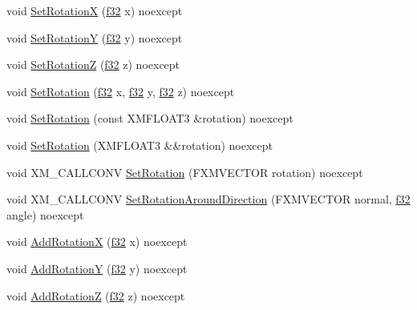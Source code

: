 \begin{DoxyCompactItemize}
\item 
void \hyperlink{structmage_1_1_transform_node_a5176ee15f528c0c9a7d7fb716a69362a}{Set\+RotationX} (\hyperlink{namespacemage_a6a44ad388483959dc4dff9f2aef91431}{f32} x) noexcept
\item 
void \hyperlink{structmage_1_1_transform_node_ae117a889122ecdb4f7e16a78f240c7c6}{Set\+RotationY} (\hyperlink{namespacemage_a6a44ad388483959dc4dff9f2aef91431}{f32} y) noexcept
\item 
void \hyperlink{structmage_1_1_transform_node_a2fe3254e45a9ab3a7513f2162bd17c7f}{Set\+RotationZ} (\hyperlink{namespacemage_a6a44ad388483959dc4dff9f2aef91431}{f32} z) noexcept
\item 
void \hyperlink{structmage_1_1_transform_node_ad11cdc2280a68d309f2e725edbe85ba6}{Set\+Rotation} (\hyperlink{namespacemage_a6a44ad388483959dc4dff9f2aef91431}{f32} x, \hyperlink{namespacemage_a6a44ad388483959dc4dff9f2aef91431}{f32} y, \hyperlink{namespacemage_a6a44ad388483959dc4dff9f2aef91431}{f32} z) noexcept
\item 
void \hyperlink{structmage_1_1_transform_node_a602e7426e81f712a2c5dfcb29e69457b}{Set\+Rotation} (const X\+M\+F\+L\+O\+A\+T3 \&rotation) noexcept
\item 
void \hyperlink{structmage_1_1_transform_node_aceda2ef578b04428dd7a271943daa8c8}{Set\+Rotation} (X\+M\+F\+L\+O\+A\+T3 \&\&rotation) noexcept
\item 
void X\+M\+\_\+\+C\+A\+L\+L\+C\+O\+NV \hyperlink{structmage_1_1_transform_node_a354d20ffedec33173a598718677f7a74}{Set\+Rotation} (F\+X\+M\+V\+E\+C\+T\+OR rotation) noexcept
\item 
void X\+M\+\_\+\+C\+A\+L\+L\+C\+O\+NV \hyperlink{structmage_1_1_transform_node_a2507c9b2ba9c22f840a6d4f7fbf6e26b}{Set\+Rotation\+Around\+Direction} (F\+X\+M\+V\+E\+C\+T\+OR normal, \hyperlink{namespacemage_a6a44ad388483959dc4dff9f2aef91431}{f32} angle) noexcept
\item 
void \hyperlink{structmage_1_1_transform_node_a345433c783c276d3a68951ef9f57c90e}{Add\+RotationX} (\hyperlink{namespacemage_a6a44ad388483959dc4dff9f2aef91431}{f32} x) noexcept
\item 
void \hyperlink{structmage_1_1_transform_node_aaec0123b3c40af36c346663045849447}{Add\+RotationY} (\hyperlink{namespacemage_a6a44ad388483959dc4dff9f2aef91431}{f32} y) noexcept
\item 
void \hyperlink{structmage_1_1_transform_node_ac1488ba0b460fa73ea387e9e08a9321b}{Add\+RotationZ} (\hyperlink{namespacemage_a6a44ad388483959dc4dff9f2aef91431}{f32} z) noexcept
\item 

\end{DoxyCompactItemize}
